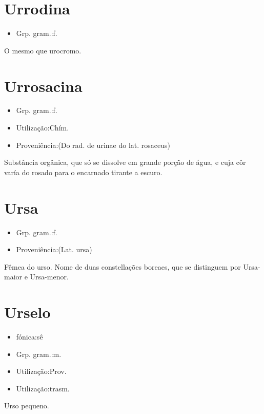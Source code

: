 \documentclass{article}
\begin{document}
\section{Urrodina}
\begin{itemize}
\item {Grp. gram.:f.}
\end{itemize}
O mesmo que \textunderscore urocromo\textunderscore .
\section{Urrosacina}
\begin{itemize}
\item {Grp. gram.:f.}
\end{itemize}
\begin{itemize}
\item {Utilização:Chím.}
\end{itemize}
\begin{itemize}
\item {Proveniência:(Do rad. de \textunderscore urina\textunderscore  e do lat. \textunderscore rosaceus\textunderscore )}
\end{itemize}
Substância orgânica, que só se dissolve em grande porção de água, e cuja côr varía do rosado para o encarnado tirante a escuro.
\section{Ursa}
\begin{itemize}
\item {Grp. gram.:f.}
\end{itemize}
\begin{itemize}
\item {Proveniência:(Lat. \textunderscore ursa\textunderscore )}
\end{itemize}
Fêmea do urso.
Nome de duas constellações boreaes, que se distinguem por Ursa-maior e Ursa-menor.
\section{Urselo}
\begin{itemize}
\item {fónica:sê}
\end{itemize}
\begin{itemize}
\item {Grp. gram.:m.}
\end{itemize}
\begin{itemize}
\item {Utilização:Prov.}
\end{itemize}
\begin{itemize}
\item {Utilização:trasm.}
\end{itemize}
Urso pequeno.
\end{document}
